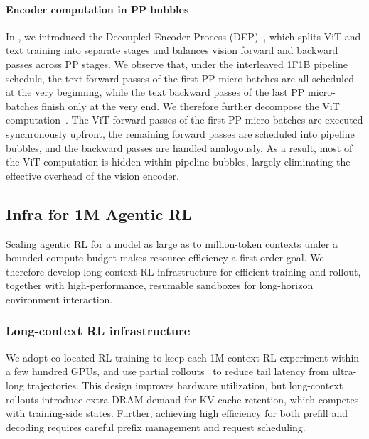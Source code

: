 \paragraph{Encoder computation in PP bubbles}
In , we introduced the Decoupled Encoder Process (DEP)~\citep{kimik25}, which splits ViT and text training into separate stages and balances vision forward and backward passes across PP stages.
We observe that, under the interleaved 1F1B pipeline schedule, the text forward passes of the first PP micro-batches are all scheduled at the very beginning, while the text backward passes of the last PP micro-batches finish only at the very end.
We therefore further decompose the ViT computation~\citep{feng2025optimusacceleratinglargescalemultimodal}.
The ViT forward passes of the first PP micro-batches are executed synchronously upfront, the remaining forward passes are scheduled into pipeline bubbles, and the backward passes are handled analogously.
As a result, most of the ViT computation is hidden within pipeline bubbles, largely eliminating the effective overhead of the vision encoder.






\subsection{Infra for 1M Agentic RL}

Scaling agentic RL for a model as large as  to million-token contexts under a bounded compute budget makes resource efficiency a first-order goal. We therefore develop long-context RL infrastructure for efficient training and rollout, together with high-performance, resumable sandboxes for long-horizon environment interaction.

\subsubsection{Long-context RL infrastructure}
We adopt co-located RL training \cite{kimiteam2025kimik2openagentic} to keep each 1M-context  RL experiment within a few hundred GPUs, and use partial rollouts~\cite{kimik15} to reduce tail latency from ultra-long trajectories. This design improves hardware utilization, but long-context rollouts introduce extra DRAM demand for KV-cache retention, which competes with training-side states. Further, achieving high efficiency for both prefill and decoding requires careful prefix management and request scheduling.

